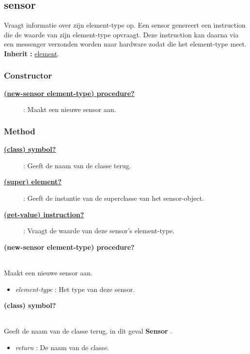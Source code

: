 \documentclass{article}
\newcommand{\ar}{\ding{213} }
\newcommand{\code}[1]{\textcolor{code}{#1}}
\newcommand{\lb}[1][]{\code{(#1}}
\newcommand{\rb}{\code{)}}
\newcommand{\racket}[1]{
	{\color{blue}\textbf{#1}}
}
\begin{document}
\newpage
\hypertarget{sensor}{\subsection{sensor}}
Vraagt informatie over zijn element-type op. Een sensor genereert een instruction die de waarde van zijn element-type opvraagt. Deze instruction kan daarna via een messenger verzonden worden naar hardware zodat die het element-type meet.
\\\textbf{Inherit :} \hyperlink{element}{element}.

\subsubsection{Constructor}
\begin{description}
\item[\hyperlink{sensor:new-sensor}{\racket{\lb[new-sensor] element-type\rb \ar \code{procedure?}}}] : Maakt een nieuwe sensor aan.
\end{description}

\subsubsection{Method}
\begin{description}
\item[\hyperlink{sensor:class}{\racket{\lb[class]\rb \ar \code{symbol?}}}] : Geeft de naam van de classe terug.
\item[\hyperlink{sensor:super}{\racket{\lb[super]\rb \ar \code{element?}}}] : Geeft de instantie van de superclasse van het sensor-object.
\item[\hyperlink{sensor:get-value}{\racket{\lb[get-value]\rb \ar \code{instruction?}}}] : Vraagt de waarde van deze sensor's element-type.
\end{description}

\begin{framed}
\hypertarget{sensor:new-sensor}{\racket{\lb[new-sensor] element-type\rb \ar \code{procedure?}}}
\\Maakt een nieuwe sensor aan.
\begin{itemize}
	\item \emph{element-type} : Het type van deze sensor.
\end{itemize}
\end{framed}

\begin{framed}
\hypertarget{sensor:class}{\racket{\lb[class]\rb \ar \code{symbol?}}}
\\Geeft de naam van de classe terug, in dit geval \racket{Sensor}.
\begin{itemize}
	\item \emph{return} : De naam van de classe.
\end{itemize}
\end{framed}
\end{document}
